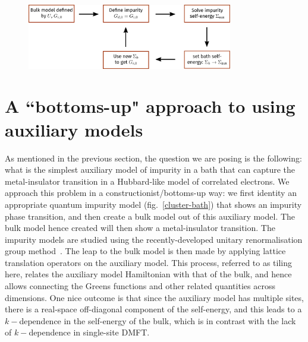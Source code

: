 \documentclass[prb]{revtex4-2}
\begin{document}
\begin{figure}[!htb]
	\centering
	\includegraphics[width=0.8\textwidth]{dmft.pdf}
\end{figure}


\section{A ``bottoms-up" approach to using auxiliary models}
As mentioned in the previous section, the question we are posing is the following: what is the simplest auxiliary model of impurity in a bath that can capture the metal-insulator transition in a Hubbard-like model of correlated electrons. We approach this problem in a constructionist/bottoms-up way: we first identity an appropriate quantum impurity model (fig.~\ref{cluster-bath}) that shows an impurity phase transition, and then create a bulk model out of this auxiliary model. The bulk model hence created will then show a metal-insulator transition. The impurity models are studied using the recently-developed unitary renormalisation group method~\cite{anirbanmott1,anirbanmott2,anirbanurg1,anirbanurg2,siddharthacpi,santanukagome}. The leap to the bulk model is then made by applying lattice translation operators on the auxiliary model. This process, referred to as tiling here, relates the auxiliary model Hamiltonian with that of the bulk, and hence allows connecting the Greens functions and other related quantities across dimensions. One nice outcome is that since the auxiliary model has multiple sites, there is a real-space off-diagonal component of the self-energy, and this leads to a \(k-\)dependence in the self-energy of the bulk, which is in contrast with the lack of \(k-\)dependence in single-site DMFT.  
\end{document}
